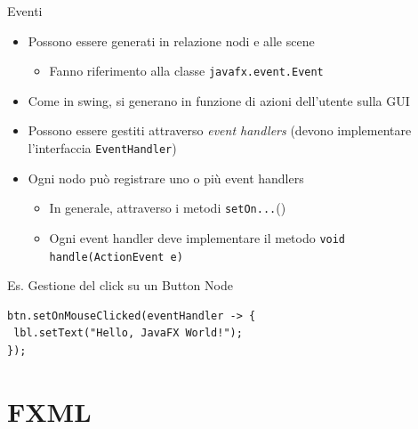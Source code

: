 \documentclass[presentation]{beamer}
\begin{document}
\begin{frame}[fragile]{Eventi}
\begin{itemize}\itemsep10pt
\item Possono essere generati in relazione nodi e alle scene
\begin{itemize}
\item Fanno riferimento alla classe \texttt{javafx.event.Event}
\end{itemize}
\item Come in swing, si generano in funzione di azioni dell'utente sulla GUI
\item Possono essere gestiti attraverso \emph{event handlers} (devono implementare l'interfaccia \texttt{EventHandler})
\item Ogni nodo può registrare uno o più event handlers
\begin{itemize}
\item In generale, attraverso i metodi \texttt{setOn...}()
\item Ogni event handler deve implementare il metodo \texttt{void handle(ActionEvent e)}
\end{itemize}
\end{itemize}

\begin{block}{Es. Gestione del click su un Button Node}
\begin{lstlisting}
btn.setOnMouseClicked(eventHandler -> {
 lbl.setText("Hello, JavaFX World!");
});
\end{lstlisting}
\end{block}
\end{frame}

%
%

\section{FXML}
\end{document}
